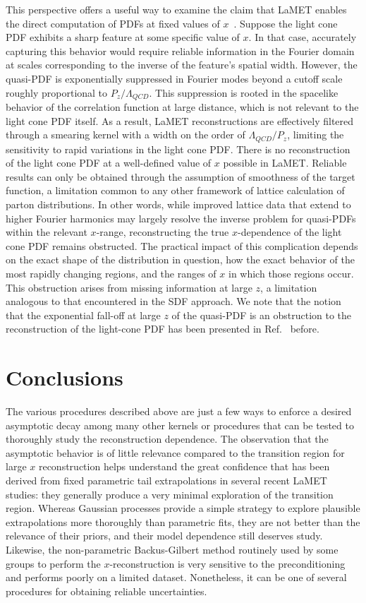 \documentclass[aps,prl,groupedaddress,twocolumn,superscriptaddress,amsfonts,amssymb,amsmath,showpacs,floatfix,preprintnumbers]{revtex4-2}
\begin{document}
This perspective offers a useful way to examine the claim that LaMET enables the direct computation of PDFs at fixed values of $x$~\cite{Ji:2022ezo, Ji:2024oka}. Suppose the light cone PDF exhibits a sharp feature at some specific value of $x$. In that case, accurately capturing this behavior would require reliable information in the Fourier domain at scales corresponding to the inverse of the feature's spatial width. However, the quasi-PDF is exponentially suppressed in Fourier modes beyond a cutoff scale roughly proportional to $P_z / \Lambda_{QCD}$. This suppression is rooted in the spacelike behavior of the correlation function at large distance, which is not relevant to the  light cone PDF itself. As a result, LaMET reconstructions are effectively filtered through a smearing kernel with a width on the order of $\Lambda_{QCD} / P_z$, limiting the sensitivity to rapid variations in the light cone PDF. There is no reconstruction of the light cone PDF at a well-defined value of $x$ possible in LaMET. Reliable results can only be obtained through the assumption of smoothness of the target function, a limitation common to any other framework of lattice calculation of parton distributions. In other words, while improved lattice data that extend to higher Fourier harmonics may largely resolve the inverse problem for quasi-PDFs within the relevant $x$-range, reconstructing the true $x$-dependence of the light cone PDF remains obstructed. The practical impact of this complication depends on the exact shape of the distribution in question, how the exact behavior of the most rapidly changing regions, and the ranges of $x$ in which those regions occur. This obstruction arises from missing information at large $z$, a limitation analogous to that encountered in the SDF approach. We note that the notion that the exponential fall-off at large $z$ of the quasi-PDF is an obstruction to the reconstruction of the light-cone PDF has been presented in Ref.~\cite{Ji:2020brr} before.

\section{Conclusions}

The various procedures described above are just a few ways to enforce a desired asymptotic decay among many other kernels or procedures that can be tested to thoroughly study the reconstruction dependence. The observation that the asymptotic behavior is of little relevance compared to the transition region for large $x$ reconstruction helps understand the great confidence that has been derived from fixed parametric tail extrapolations in several recent LaMET studies: they generally produce a very minimal exploration of the transition region. Whereas Gaussian processes provide a simple strategy to explore plausible extrapolations more thoroughly than parametric fits, they are not better than the relevance of their priors, and their model dependence still deserves study. Likewise, the non-parametric Backus-Gilbert method routinely used by some groups to perform the $x$-reconstruction is very sensitive to the preconditioning and performs poorly on a limited dataset. Nonetheless, it can be one of several procedures for obtaining reliable uncertainties.
\end{document}
